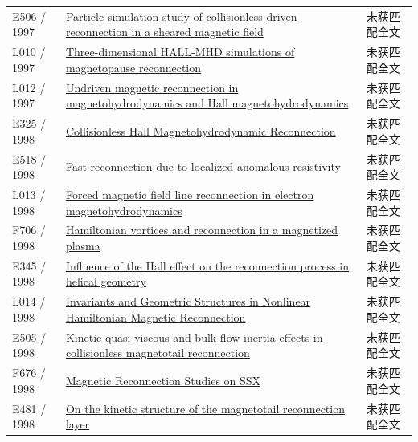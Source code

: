 \documentclass[UTF8,a4paper,11pt,openany,fontset=fandol]{ctexbook}
\begin{document}
\begin{longtable}{P{24mm}P{97mm}P{27mm}}
E506 / 1997 & \href{https://doi.org/10.1063/1.872088}{Particle simulation study of collisionless driven reconnection in a sheared magnetic field} & 未获匹配全文\\

L010 / 1997 & \href{https://doi.org/10.1016/s0079-1946(97)00206-1}{Three-dimensional HALL-MHD simulations of magnetopause reconnection} & 未获匹配全文\\

L012 / 1997 & \href{https://doi.org/10.1029/96ja03634}{Undriven magnetic reconnection in magnetohydrodynamics and Hall magnetohydrodynamics} & 未获匹配全文\\

E325 / 1998 & \href{http://ui.adsabs.harvard.edu/abs/1998APS..DPP.K6S43M/abstract}{Collisionless Hall Magnetohydrodynamic Reconnection} & 未获匹配全文\\

E518 / 1998 & \href{https://doi.org/10.1063/1.873046}{Fast reconnection due to localized anomalous resistivity} & 未获匹配全文\\

L013 / 1998 & \href{https://doi.org/10.1063/1.873005}{Forced magnetic field line reconnection in electron magnetohydrodynamics} & 未获匹配全文\\

F706 / 1998 & \href{https://doi.org/10.1017/s0022377898006655}{Hamiltonian vortices and reconnection in a magnetized plasma} & 未获匹配全文\\

E345 / 1998 & \href{http://ui.adsabs.harvard.edu/abs/1998PlPhR..24..929Z/abstract}{Influence of the Hall effect on the reconnection process in helical geometry} & 未获匹配全文\\

L014 / 1998 & \href{https://doi.org/10.1103/physrevlett.80.4430}{Invariants and Geometric Structures in Nonlinear Hamiltonian Magnetic Reconnection} & 未获匹配全文\\

E505 / 1998 & \href{https://doi.org/10.1029/97ja02699}{Kinetic quasi‐viscous and bulk flow inertia effects in collisionless magnetotail reconnection} & 未获匹配全文\\

F676 / 1998 & \href{https://works.swarthmore.edu/theses/680}{Magnetic Reconnection Studies on SSX} & 未获匹配全文\\

E481 / 1998 & \href{https://doi.org/10.1029/98gl52510}{On the kinetic structure of the magnetotail reconnection layer} & 未获匹配全文\\


\end{longtable}
\end{document}
